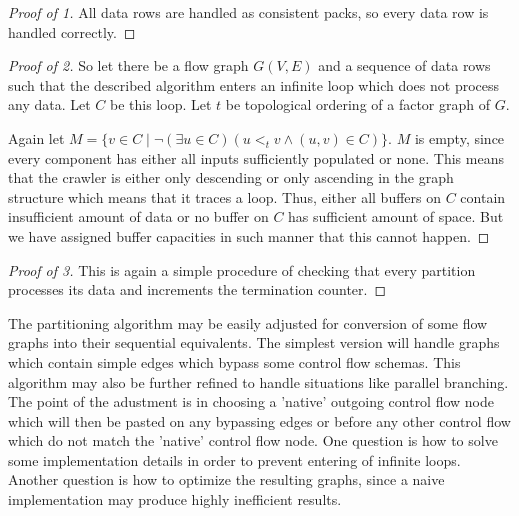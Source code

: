 \begin{claim}
\begin{proof}[Proof of 1]
  All data rows are handled as consistent packs, so every data row is handled correctly.
\end{proof}
\begin{proof}[Proof of 2] So let there be a flow graph $G(V,E)$ and a sequence of data rows such that the described algorithm enters an infinite loop which does not process any data. Let $C$ be this loop. Let $t$ be topological ordering of a factor graph of $G$. 
  \item Again let $M = \{v \in C \mid \neg (\exists u \in C)( u <_t v \land (u,v) \in C)\}$. $M$ is empty, since every component has either all inputs sufficiently populated or none. This means that the crawler is either only descending or only ascending in the graph structure which means that it traces a loop. Thus, either all buffers on $C$ contain insufficient amount of data or no buffer on $C$ has sufficient amount of space. But we have assigned buffer capacities in such manner that this cannot happen.
\end{proof}
\begin{proof}[Proof of 3]
  This is again a simple procedure of checking that every partition processes its data and increments the termination counter.
\end{proof}
\end{claim}

\begin{rem} 
  The partitioning algorithm may be easily adjusted for conversion of some flow graphs into their sequential equivalents. The simplest version will handle graphs which contain simple edges which bypass some control flow schemas. This algorithm may also be further refined to handle situations like parallel branching. The point of the adustment is in choosing a 'native' outgoing control flow node which will then be pasted on any bypassing edges or before any other control flow which do not match the 'native' control flow node. One question is how to solve some implementation details in order to prevent entering of infinite loops. Another question is how to optimize the resulting graphs, since a naive implementation may produce highly inefficient results. 
\end{rem}



